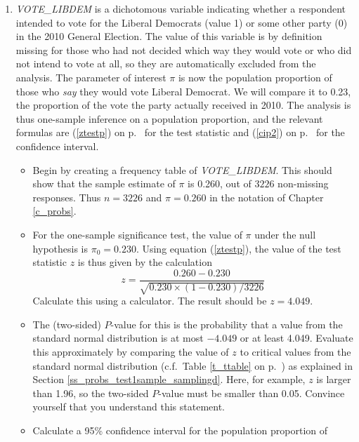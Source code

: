 
\begin{enumerate}
\item
\emph{VOTE\_LIBDEM} is a dichotomous variable indicating whether a
respondent intended to vote for the Liberal Democrats (value 1) or some other
party (0) in the 2010 General Election. The value of this variable is by
definition missing for those who had not decided which way they would vote or who did
not intend to vote at all, so they
are automatically excluded from the analysis. The parameter of interest $\pi$ is now the
population proportion of those who \emph{say} they would vote Liberal Democrat. We
will compare it to 0.23, the proportion of the vote the party actually
received in 2010. The analysis is thus one-sample inference on a
population proportion, and the relevant formulas are (\ref{ztestp}) on p.\ \pageref{ztestp} for
the test statistic and (\ref{cip2}) on p.\ \pageref{cip2} for the
confidence interval.
\begin{itemize}
\item
Begin by creating a frequency table of
\emph{VOTE\_LIBDEM}. This should show that the sample estimate of $\pi$ is
0.260, out of $3226$ non-missing responses.
Thus $n=3226$ and $\hat{\pi}=0.260$ in the notation of Chapter
\ref{c_probs}.
\item
For the one-sample significance test, the value of $\pi$ under the
null hypothesis is $\pi_{0}=0.230$. Using equation (\ref{ztestp}), the
value of the test statistic $z$ is thus given by the calculation
\[
z = \frac{0.260-0.230}{\sqrt{0.230\times (1-0.230)/3226}}
\]
Calculate this using a calculator.
The result should be $z=4.049$.
\item
The (two-sided) $P$-value for this is the probability that a value from
the standard normal distribution is at most $-4.049$ or at least 4.049.
Evaluate this approximately by comparing the value of $z$ to
critical values from the standard normal distribution (c.f.\ Table
\ref{t_ttable} on p.\ \pageref{t_ttable}) as explained in Section
\ref{ss_probs_test1sample_samplingd}.
Here, for example, $z$ is larger than 1.96, so the two-sided $P$-value
must be smaller than 0.05. Convince yourself that you understand this
statement.
\item
Calculate a 95\% confidence interval for the population proportion of

\end{itemize}
\end{enumerate}
